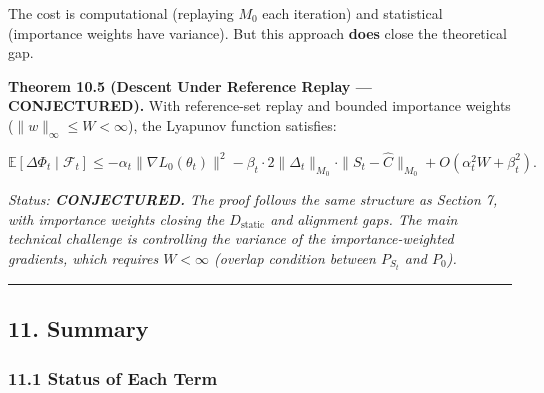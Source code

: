 \documentclass[
  12pt,
]{ctexart}
\begin{document}
The cost is computational (replaying \(M_0\) each iteration) and
statistical (importance weights have variance). But this approach
\textbf{does} close the theoretical gap.

\textbf{Theorem 10.5 (Descent Under Reference Replay --- CONJECTURED).}
With reference-set replay and bounded importance weights
(\(\|w\|_\infty \leq W < \infty\)), the Lyapunov function satisfies:

\[\mathbb{E}[\Delta\Phi_t \mid \mathcal{F}_t] \leq -\alpha_t \|\nabla L_0(\theta_t)\|^2 - \beta_t \cdot 2 \|\Delta_t\|_{M_0} \cdot \|S_t - \hat{C}\|_{M_0} + O(\alpha_t^2 W + \beta_t^2).\]

\emph{Status: \textbf{CONJECTURED.} The proof follows the same structure
as Section 7, with importance weights closing the \(D_{\text{static}}\)
and alignment gaps. The main technical challenge is controlling the
variance of the importance-weighted gradients, which requires
\(W < \infty\) (overlap condition between \(P_{S_t}\) and \(P_0\)).}

\begin{center}\rule{0.5\linewidth}{0.5pt}\end{center}

\subsection{11. Summary}\label{summary}

\subsubsection{11.1 Status of Each Term}\label{status-of-each-term}
\end{document}
